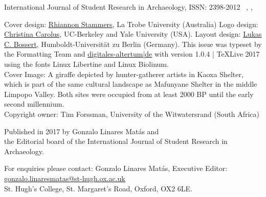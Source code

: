 
\IJSRAtitlepage
\clearpage
\mypagesize
\thispagestyle{empty}
\hfill
\vfill

\begin{footnotesize}
\noindent International Journal of Student Research in Archaeology,\newline
ISSN: 2398-2012\newline
\IJSRAmonth\ \IJSRAyear , \IJSRAvolume , \IJSRAnumber\\
\vspace{2em}


\noindent Cover design: \href{https://latrobe.academia.edu/RhiannonStammers}{Rhiannon Stammers}, La Trobe University (Australia)\newline
\noindent Logo design: \href{https://hraf.yale.edu/about/staff/christina-carolus/}{Christina Carolus}, UC-Berkeley and Yale University (USA).\newline
\noindent Layout design: \href{https://hu-berlinhttps://dainst.academia.edu/LukasCBossert}{Lukas C. Bossert}, Humboldt-Universität zu Berlin (Germany). \newline \indent This issue was typeset by the Formatting Team and \href{www.digitales-altertum.de}{digitales-altertum|de}  with  version 1.0.4 | \TeX Live 2017 \\ \indent using the fonts Linux Libertine and {\sffamily Linux Biolinum}.\\
Cover Image: 
A giraffe depicted by hunter-gatherer artists in Kaoxa Shelter, which is part of the same cultural landscape as Mafunyane Shelter in the middle Limpopo Valley. Both sites were occupied from at least 2000 BP until the early second millennium\AD.\\
Copyright owner: Tim Forssman, University of the Witwatersrand (South Africa)

\vspace{2em}

\noindent Published in 2017 by Gonzalo Linares Matás and \\ the Editorial board of the International Journal of Student Research in Archaeology. 




\vspace{2em}






\noindent For enquiries please contact: Gonzalo Linares Matás, Executive Editor:\\ \href{mailto:gonzalo.linaresmatas@st-hugh.ox.ac.uk}{gonzalo.linaresmatas@st-hugh.ox.ac.uk}\\  St. Hugh’s College, St. Margaret’s Road, Oxford, OX2 6LE.


\end{footnotesize}
